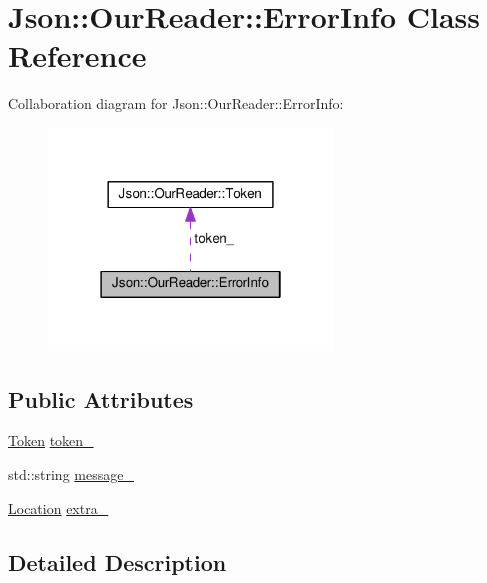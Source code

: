 \hypertarget{class_json_1_1_our_reader_1_1_error_info}{}\section{Json\+:\+:Our\+Reader\+:\+:Error\+Info Class Reference}
\label{class_json_1_1_our_reader_1_1_error_info}


Collaboration diagram for Json\+:\+:Our\+Reader\+:\+:Error\+Info\+:\nopagebreak
\begin{figure}[H]
\begin{center}
\leavevmode
\includegraphics[width=214pt]{class_json_1_1_our_reader_1_1_error_info__coll__graph}
\end{center}
\end{figure}
\subsection*{Public Attributes}
\begin{DoxyCompactItemize}
\item 
\hyperlink{class_json_1_1_our_reader_1_1_token}{Token} \hyperlink{class_json_1_1_our_reader_1_1_error_info_ad05204ecabe5e7201a842935b874ae9a}{token\+\_\+}
\item 
std\+::string \hyperlink{class_json_1_1_our_reader_1_1_error_info_a9c973ff4d2c47134b770027d5d37d906}{message\+\_\+}
\item 
\hyperlink{class_json_1_1_our_reader_a1bdc7bbc52ba87cae6b19746f2ee0189}{Location} \hyperlink{class_json_1_1_our_reader_1_1_error_info_a77ba2d32a471c7b9bc14621b76a5bdab}{extra\+\_\+}
\end{DoxyCompactItemize}


\subsection{Detailed Description}



